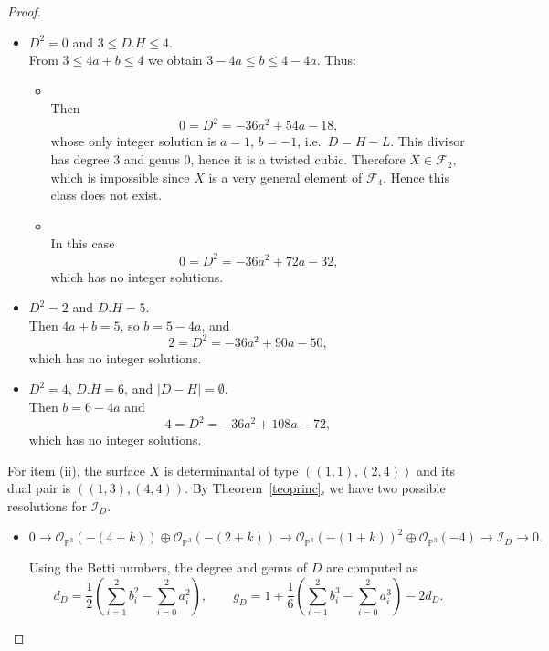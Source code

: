 \documentclass[12pt,reqno]{amsart}
\theoremstyle{plain}
\theoremstyle{definition}
\theoremstyle{remark}
\theoremstyle{definition}
\newcommand{\PP}{\mathds{P}}
\newcommand{\PPP}{\PP^{3}}
\newcommand{\ii}{\mathscr{I}}
\newcommand{\oo}{\mathcal{O}}
\begin{document}
\begin{proof}
\begin{itemize}
    \item $D^{2}=0$ and $3\leq D.H\leq 4$.\\
    From $3\leq 4a+b\leq 4$ we obtain $3-4a\leq b\leq 4-4a$.
    Thus:
    \begin{itemize}
        \item[$b=3-4a$] $ $\\
        Then
        \[
        0=D^{2}=-36a^{2}+54a-18,
        \]
        whose only integer solution is $a=1$, $b=-1$, i.e.\ $D=H-L$.
        This divisor has degree $3$ and genus $0$, hence it is a twisted cubic.
        Therefore $X\in\mathcal{F}_2$, which is impossible since $X$ is a very
        general element of $\mathcal{F}_4$. Hence this class does not exist.

        \item[$b=4-4a$] $ $\\
        In this case
        \[
        0=D^{2}=-36a^{2}+72a-32,
        \]
        which has no integer solutions.
    \end{itemize}

    \item $D^{2}=2$ and $D.H=5$.\\
    Then $4a+b=5$, so $b=5-4a$, and
    \[
    2=D^{2}=-36a^{2}+90a-50,
    \]
    which has no integer solutions.

    \item $D^{2}=4$, $D.H=6$, and $|D-H|=\emptyset$.\\
    Then $b=6-4a$ and
    \[
    4=D^{2}=-36a^{2}+108a-72,
    \]
    which has no integer solutions.
\end{itemize}

For item (ii), the surface $X$ is determinantal of type $((1,1),(2,4))$ and its dual
pair is $((1,3),(4,4))$. By Theorem~\ref{teoprinc}, we have two possible resolutions for
$\ii_D$.

\begin{itemize}
    \item[\textbf{Case 1:}]
    \[
    0\to \oo_{\PPP}(-(4+k))\oplus \oo_{\PPP}(-(2+k))
    \to \oo_{\PPP}(-(1+k))^{2}\oplus \oo_{\PPP}(-4)
    \to \ii_D\to0.
    \]

    Using the Betti numbers, the degree and genus of $D$ are computed as
    \begin{equation}\label{ecuagradoygenero}
        d_D=\frac{1}{2}\left(\sum_{i=1}^{2}b_i^2-\sum_{i=0}^{2}a_i^2\right),\qquad
        g_D=1+\frac{1}{6}\left(\sum_{i=1}^{2}b_i^3-\sum_{i=0}^{2}a_i^3\right)-2d_D.
    \end{equation}


\end{itemize}
\end{proof}
\end{document}
